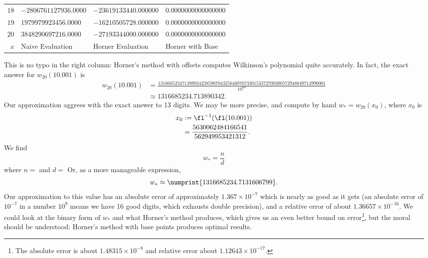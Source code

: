\begin{ex}
\begin{center}
\begin{longtable}{r|l|l|l}
$18$ &$-2806761127936.0000$ &$-23619133440.000000$ &$0.0000000000000000$ \\
$19$ &$1979979923456.0000$ &$-16210505728.000000$ &$0.0000000000000000$ \\
$20$ &$3848290697216.0000$ &$-27193344000.000000$ &$0.0000000000000000$ \\
 \hline
$x$ & Naive Evaluation & Horner Evaluation & Horner with Base
 \end{longtable}
  \end{center}
This is no typo in the right column: Horner's method with offsets
computes Wilkinson's polynomial quite accurately. In fact, the exact
answer for $w_{20}(10.001)$ is
\begin{align}
  w_{20}(10.001) &= \frac{1316685234713890342385967043256460767330153372700300572948849714990001}
    {10^{60}}\nonumber\\
    &\approx 1316685234.713890342.
\end{align}
  Our approximation aggrees with the exact answer to 13 digits. We may
  be more precise, and compute by hand $w_{*}=w_{20}(x_{0})$, where
  $x_{0}$ is
  \begin{equation}
    \begin{split}
      x_{0}&:= \fl^{-1}(\fl(10.001))\\
      &=\frac{5630062484166541}{562949953421312}.
    \end{split}
  \end{equation}
  We find
  \begin{equation}
    w_{*} = \frac{n}{d}
  \end{equation}
  where
  \medbreak
  \begingroup
\noindent $n =$ 
\endgroup
\medbreak
\noindent and
\medbreak
  \begingroup
\noindent $d =$ 
  \endgroup
  \medbreak\noindent%
Or, as a more manageable expression,
  \begin{equation}
    w_{*} \approx \numprint{1316685234.7131606799}.
  \end{equation}
  Our approximation to this value has an absolute error of approximately
  $1.367\times10^{-7}$ which is nearly as good as it gets (an absolute
  error of $10^{-7}$ in a number $10^{9}$ means we have 16 good digits,
  which exhausts double precision), and a relative error of about
  $1.36657\times10^{-16}$. We could look at the binary form of $w_{*}$
  and what Horner's method produces, which gives us an even better bound
  on error\footnote{The absolute error is about $1.48315\times 10^{-8}$ and
  relative error about $1.12643\times10^{-17}$.}, but the moral should be understood: Horner's method with
  base points produces optimal results.
\end{ex}
